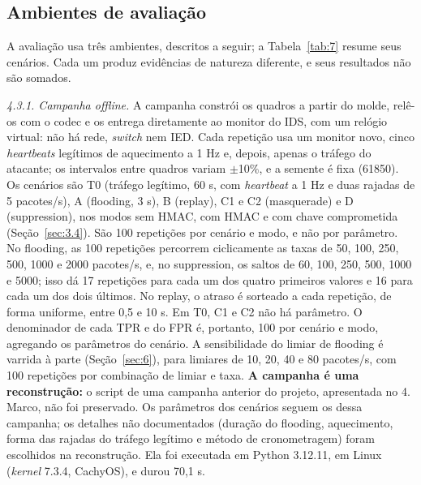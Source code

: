 \documentclass[12pt]{article}
\begin{document}
\subsection{Ambientes de avaliação}\label{sec:4.3}

A avaliação usa três ambientes, descritos a seguir; a Tabela~\ref{tab:7} resume seus cenários. Cada um produz evidências de natureza diferente, e seus resultados não são somados.

\emph{4.3.1. Campanha offline.} A campanha constrói os quadros a partir do molde, relê-os com o codec e os entrega diretamente ao monitor do IDS, com um relógio virtual: não há rede, \emph{switch} nem IED. Cada repetição usa um monitor novo, cinco \emph{heartbeats} legítimos de aquecimento a 1 Hz e, depois, apenas o tráfego do atacante; os intervalos entre quadros variam \ensuremath{\pm}10\%, e a semente é fixa (61850). Os cenários são T0 (tráfego legítimo, 60 s, com \emph{heartbeat} a 1 Hz e duas rajadas de 5 pacotes/s), A (flooding, 3 s), B (replay), C1 e C2 (masquerade) e D (suppression), nos modos sem HMAC, com HMAC e com chave comprometida (Seção~\ref{sec:3.4}). São 100 repetições por cenário e modo, e não por parâmetro. No flooding, as 100 repetições percorrem ciclicamente as taxas de 50, 100, 250, 500, 1000 e 2000 pacotes/s, e, no suppression, os saltos de 60, 100, 250, 500, 1000 e 5000; isso dá 17 repetições para cada um dos quatro primeiros valores e 16 para cada um dos dois últimos. No replay, o atraso é sorteado a cada repetição, de forma uniforme, entre 0,5 e 10 s. Em T0, C1 e C2 não há parâmetro. O denominador de cada TPR e do FPR é, portanto, 100 por cenário e modo, agregando os parâmetros do cenário. A sensibilidade do limiar de flooding é varrida à parte (Seção~\ref{sec:6}), para limiares de 10, 20, 40 e 80 pacotes/s, com 100 repetições por combinação de limiar e taxa. \textbf{A campanha é uma reconstrução:} o script de uma campanha anterior do projeto, apresentada no 4.\textordmasculine{} Marco, não foi preservado. Os parâmetros dos cenários seguem os dessa campanha; os detalhes não documentados (duração do flooding, aquecimento, forma das rajadas do tráfego legítimo e método de cronometragem) foram escolhidos na reconstrução. Ela foi executada em Python 3.12.11, em Linux (\emph{kernel} 7.3.4, CachyOS), e durou 70,1 s.
\end{document}
